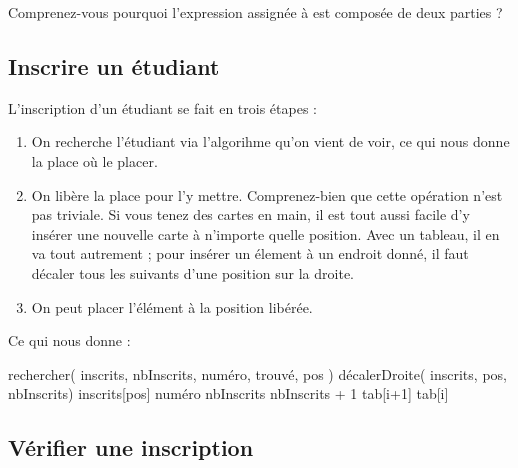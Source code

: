 			Comprenez-vous pourquoi l'expression assignée à 
			est composée de deux parties ?

		\subsection{Inscrire un étudiant}
				
			L'inscription d'un étudiant se fait en trois étapes :
			\begin{enumerate}
			\item
				On recherche l'étudiant via l'algorihme qu'on vient de voir,
				ce qui nous donne la place où le placer.
			\item
				On libère la place pour l'y mettre.
				Comprenez-bien que cette opération n'est pas triviale.
				Si vous tenez des cartes en main, 
				il est tout aussi facile d'y insérer une nouvelle carte
				à n'importe quelle position.
				Avec un tableau,
				il en va tout autrement ;
				pour insérer un élement à un endroit donné,
				il faut décaler tous les suivants d'une position sur la droite.
			\item
				On peut placer l'élément à la position libérée.
			\end{enumerate} 
			
			Ce qui nous donne :
			
			\begin{LDA}
					\Stmt rechercher( inscrits, nbInscrits, numéro, trouvé, pos )
					\Stmt décalerDroite( inscrits, pos, nbInscrits)
					\Let inscrits[pos] \Gets numéro
					\Let nbInscrits \Gets nbInscrits + 1
				\EndAlgo
				\Empty
						\Let tab[i+1] \Gets tab[i]
					\EndFor
				\EndAlgo
			\end{LDA}
		
		\subsection{Vérifier une inscription}

